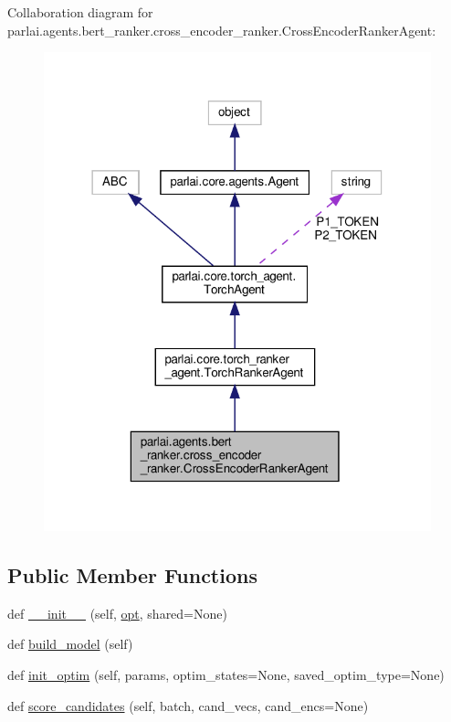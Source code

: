 Collaboration diagram for parlai.\+agents.\+bert\+\_\+ranker.\+cross\+\_\+encoder\+\_\+ranker.\+Cross\+Encoder\+Ranker\+Agent\+:
\nopagebreak
\begin{figure}[H]
\begin{center}
\leavevmode
\includegraphics[width=318pt]{classparlai_1_1agents_1_1bert__ranker_1_1cross__encoder__ranker_1_1CrossEncoderRankerAgent__coll__graph}
\end{center}
\end{figure}
\subsection*{Public Member Functions}
\begin{DoxyCompactItemize}
\item 
def \hyperlink{classparlai_1_1agents_1_1bert__ranker_1_1cross__encoder__ranker_1_1CrossEncoderRankerAgent_ab7f5e55dec9f12dc4e4dccc48c682e63}{\+\_\+\+\_\+init\+\_\+\+\_\+} (self, \hyperlink{classparlai_1_1core_1_1torch__agent_1_1TorchAgent_a785bb920cf8c8afc3e9bf6a8b77e335a}{opt}, shared=None)
\item 
def \hyperlink{classparlai_1_1agents_1_1bert__ranker_1_1cross__encoder__ranker_1_1CrossEncoderRankerAgent_a0754f7cf281a0223667ffb82c846a843}{build\+\_\+model} (self)
\item 
def \hyperlink{classparlai_1_1agents_1_1bert__ranker_1_1cross__encoder__ranker_1_1CrossEncoderRankerAgent_aedbc5976f08f86c9587c0b7486879846}{init\+\_\+optim} (self, params, optim\+\_\+states=None, saved\+\_\+optim\+\_\+type=None)
\item 
def \hyperlink{classparlai_1_1agents_1_1bert__ranker_1_1cross__encoder__ranker_1_1CrossEncoderRankerAgent_a8d75c4d4bddd44381b232a974469c432}{score\+\_\+candidates} (self, batch, cand\+\_\+vecs, cand\+\_\+encs=None)
\end{DoxyCompactItemize}
